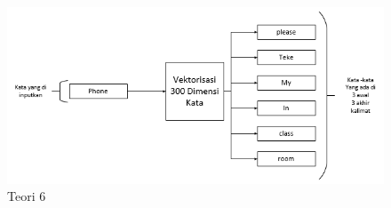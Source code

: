 \begin{enumerate}
\begin{figure}[ht]
\centering
\includegraphics[scale=0.6]{figures/1174012/chapter5/1,6.PNG}
\caption{Teori 6}
\label{contoh}
\end{figure}

\end{enumerate}
